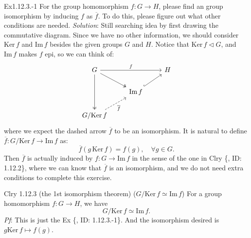 \documentclass{article}
\newcommand{\nles}{\vartriangleleft}
\newcommand{\Ker}{\text{Ker}\,}
\newcommand{\Ima}{\text{Im}\,}
\begin{document}
\begin{Th}{Ex1.12.3.-1}
    For the group homomorphism $f: G\to H$, please find an group isomorphism by inducing $f$ as $\overline{f}$. To do this, please figure out what other conditions are needed.
    \tcblower
    \textit{Solution}: Still searching idea by first drawing the commutative diagram. Since we have no other information, we should consider $\Ker f$ and $\Ima f$ besides the given groups $G$ and $H$. Notice that $\Ker f\nles G$, and $\Ima f$ makes $f$ epi, so we can think of:
    $$ \begin{tikzcd}
        G \arrow[dd, two heads] \arrow[rr, "f"] \arrow[rd, two heads] & & H \\
        & \Ima f \arrow[ru, hook] & \\
        G/\Ker f \arrow[ru, dashed, "\overline{f}"'] & &
    \end{tikzcd} $$
    where we expect the dashed arrow $\overline{f}$ to be an isomorphism. It is natural to define $\overline{f}: G/\Ker f\to\Ima f$ as:
    $$ \overline{f}(g\,\Ker f) = f(g), \quad \forall g\in G. $$
    Then $\overline{f}$ is actually induced by $f: G\to \Ima f$ in the sense of the one in Clry \{, ID: 1.12.2\}, where we can know that $\overline{f}$ is an isomorphism, and we do not need extra conditions to complete this exercise.
\end{Th}

\begin{Th}{Clry 1.12.3 (the 1st isomorphism theorem) ($G/\Ker f \simeq \Ima f$)}
    For a group homomorphism $f: G\to H$, we have
    $$ G/\Ker f \simeq \Ima f. $$
    \tcblower
    \textit{Pf}: This is just the Ex \{, ID: 1.12.3.-1\}. And the isomorphism desired is $g\Ker f \mapsto f(g)$.
\end{Th}
\end{document}
